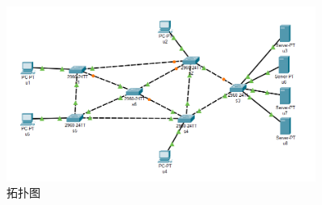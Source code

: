 \begin{figure}[h]
	\centering
	\includegraphics[width=0.9\textwidth]{../topo/topo.png}
	\caption{拓扑图}
 	\label{fig:topo2}
\end{figure}